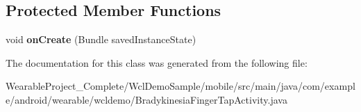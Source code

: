 \subsection*{Protected Member Functions}
\begin{DoxyCompactItemize}
\item 
void {\bfseries on\+Create} (Bundle saved\+Instance\+State)\hypertarget{classcom_1_1example_1_1android_1_1wearable_1_1wcldemo_1_1BradykinesiaFingerTapActivity_a34f5fe986d6bf472051782d3807d0bec}{}\label{classcom_1_1example_1_1android_1_1wearable_1_1wcldemo_1_1BradykinesiaFingerTapActivity_a34f5fe986d6bf472051782d3807d0bec}

\end{DoxyCompactItemize}


The documentation for this class was generated from the following file\+:\begin{DoxyCompactItemize}
\item 
Wearable\+Project\+\_\+\+Complete/\+Wcl\+Demo\+Sample/mobile/src/main/java/com/example/android/wearable/wcldemo/Bradykinesia\+Finger\+Tap\+Activity.\+java\end{DoxyCompactItemize}
